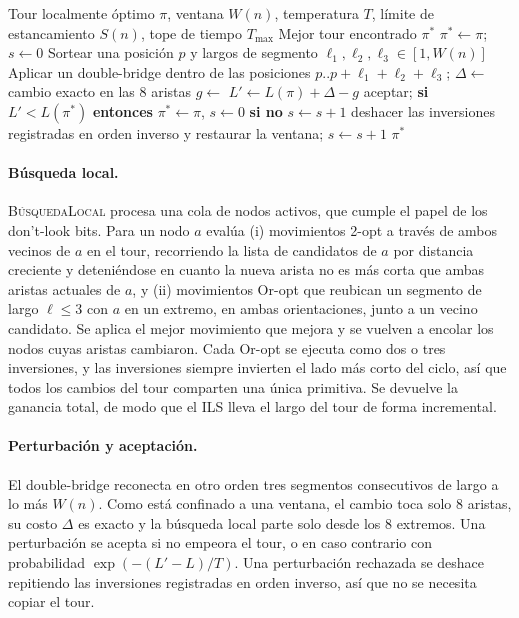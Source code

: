 \documentclass[runningheads]{llncs}
\begin{document}
\begin{algorithm}
\caption{\textsc{Pulir} --- ILS localizado con parada por estancamiento}
\label{alg:polish}
\begin{algorithmic}[1]
\Require Tour localmente óptimo $\pi$, ventana $W(n)$, temperatura $T$,
         límite de estancamiento $S(n)$, tope de tiempo $T_{\max}$
\Ensure Mejor tour encontrado $\pi^*$
\State $\pi^*\gets\pi$; $s\gets 0$
  \State Sortear una posición $p$ y largos de segmento $\ell_1,\ell_2,\ell_3\in[1,W(n)]$
  \State Aplicar un double-bridge dentro de las posiciones $p..p{+}\ell_1{+}\ell_2{+}\ell_3$;
         $\Delta\gets$ cambio exacto en las 8 aristas
  \State $g\gets$ 
  \State $L'\gets L(\pi)+\Delta-g$
    \State aceptar; \textbf{si} $L'<L(\pi^*)$ \textbf{entonces} $\pi^*\gets\pi$, $s\gets 0$
           \textbf{si no} $s\gets s+1$
  \Else
    \State deshacer las inversiones registradas en orden inverso y restaurar la ventana;
           $s\gets s+1$
  \EndIf
\EndWhile
\State \Return $\pi^*$
\end{algorithmic}
\end{algorithm}

\paragraph{Búsqueda local.}
\textsc{BúsquedaLocal} procesa una cola de nodos activos, que cumple el
papel de los don't-look bits. Para un nodo $a$ evalúa (i) movimientos
2-opt a través de ambos vecinos de $a$ en el tour, recorriendo la lista
de candidatos de $a$ por distancia creciente y deteniéndose en cuanto la
nueva arista no es más corta que ambas aristas actuales de $a$, y (ii)
movimientos Or-opt que reubican un segmento de largo $\ell\le 3$ con $a$
en un extremo, en ambas orientaciones, junto a un vecino candidato. Se
aplica el mejor movimiento que mejora y se vuelven a encolar los nodos
cuyas aristas cambiaron. Cada Or-opt se ejecuta como dos o tres
inversiones, y las inversiones siempre invierten el lado más corto del
ciclo, así que todos los cambios del tour comparten una única primitiva.
Se devuelve la ganancia total, de modo que el ILS lleva el largo del
tour de forma incremental.

\paragraph{Perturbación y aceptación.}
El double-bridge reconecta en otro orden tres segmentos consecutivos de
largo a lo más $W(n)$. Como está confinado a una ventana, el cambio toca
solo 8 aristas, su costo $\Delta$ es exacto y la búsqueda local parte
solo desde los 8 extremos. Una perturbación se acepta si no empeora el
tour, o en caso contrario con probabilidad $\exp(-(L'-L)/T)$. Una
perturbación rechazada se deshace repitiendo las inversiones registradas
en orden inverso, así que no se necesita copiar el tour.
\end{document}
